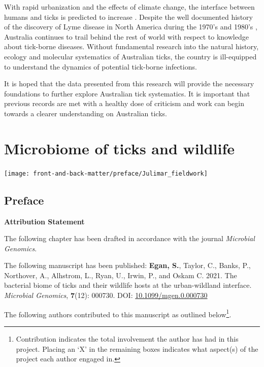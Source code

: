 \documentclass[a4paper, nobind]{templates/ociamthesis}
\renewcommand{\chaptermark}[1]{\markboth{\thechapter. #1}{\thechapter. #1}}
\begin{document}
With rapid urbanization and the effects of climate change, the interface between humans and ticks is predicted to increase \autocite{gilbertImpactsClimateChange2021}.
Despite the well documented history of the discovery of Lyme disease in North America during the 1970's and 1980's \autocite{ostfeldFunctionBiodiversityEcology2000}, Australia continues to trail behind the rest of world with respect to knowledge about tick-borne diseases.
Without fundamental research into the natural history, ecology and molecular systematics of Australian ticks, the country is ill-equipped to understand the dynamics of potential tick-borne infections.

It is hoped that the data presented from this research will provide the necessary foundations to further explore Australian tick systematics.
It is important that previous records are met with a healthy dose of criticism and work can begin towards a clearer understanding on Australian ticks.

\hypertarget{wildlife-bacteria}{%
\chapter{Microbiome of ticks and wildlife}\label{wildlife-bacteria}}

\chaptermark{Wildlife biome}

\texttt{[image: front-and-back-matter/preface/Julimar\_fieldwork]}

\newpage

\hypertarget{preface-2}{%
\section*{Preface}\label{preface-2}}

\textbf{Attribution Statement}

The following chapter has been drafted in accordance with the journal \emph{Microbial Genomics}.

The following manuscript has been published: \textbf{Egan, S.}, Taylor, C., Banks, P., Northover, A., Alhstrom, L., Ryan, U., Irwin, P., and Oskam C. 2021. The bacterial biome of ticks and their wildlife hosts at the urban-wildland interface. \emph{Microbial Genomics}, \textbf{7}(12): 000730. DOI: \href{https://doi.org/10.1099/mgen.0.000730}{10.1099/mgen.0.000730}

The following authors contributed to this manuscript as outlined below\footnote{Contribution indicates the total involvement the author has had in this project. Placing an `X' in the remaining boxes indicates what aspect(s) of the project each author engaged in.}.
\end{document}
